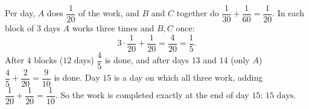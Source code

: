 Per day, $A$ does $\dfrac{1}{20}$ of the work, and $B$ and $C$ together do $\dfrac{1}{30}+\dfrac{1}{60}=\dfrac{1}{20}$. In each block of $3$ days $A$ works three times and $B,C$ once:
\[3\cdot\dfrac{1}{20}+\dfrac{1}{20}=\dfrac{4}{20}=\dfrac15.\]
After $4$ blocks ($12$ days) $\dfrac45$ is done, and after days $13$ and $14$ (only $A$) $\dfrac45+\dfrac{2}{20}=\dfrac{9}{10}$ is done. Day $15$ is a day on which all three work, adding $\dfrac{1}{20}+\dfrac{1}{20}=\dfrac{1}{10}$. So the work is completed exactly at the end of day $15$: $\boxed{15\text{ days}}$.
